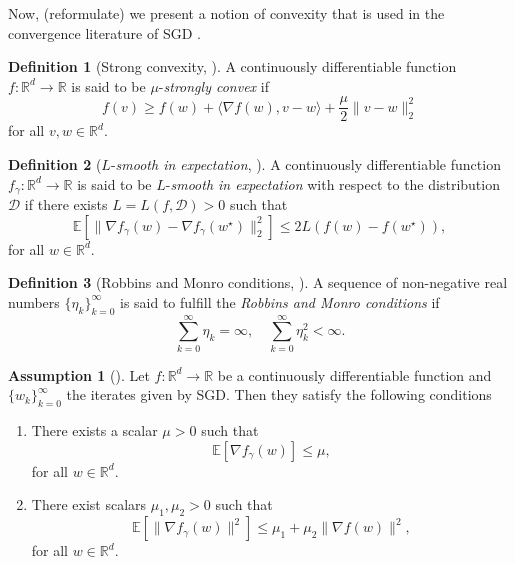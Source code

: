 \documentclass[12pt]{article}
\theoremstyle{definition}
\newtheorem{definition}[definition]{Definition}
\newtheorem{assumption}[assumption]{Assumption}
\numberwithin{equation}{section}
\newcommand{\R}{\mathbb{R}}
\newcommand{\ev}[1]{\mathbb{E}\left[{#1}\right]}
\newcommand{\norm}[1]{\lVert{#1}\rVert_2}
\begin{document}
Now, (reformulate) we present a notion of convexity that is used in the convergence literature of SGD \autocite{sebbouhAlmostSureConvergence2021}. 
\begin{definition}[Strong convexity, ]
  A continuously differentiable function $f : \mathbb{R}^d \rightarrow \mathbb{R}$ is said to be $\mu$-\emph{strongly convex} if
  \begin{equation}
    f(v) \geq f(w) + \langle \nabla f(w), v - w \rangle + \frac{\mu}{2} \norm{v - w}^2
  \end{equation}
  for all $v, w \in \mathbb{R}^d$.
\end{definition}

\begin{definition}[$L$-\emph{smooth in expectation}, ]
  A continuously differentiable  function $f_{\gamma}:\mathbb{R}^d \rightarrow \mathbb{R}$ is said to be $L$-\emph{smooth in expectation} with respect to the distribution $\mathcal{D}$ if there exists $L = L(f, \mathcal{D}) > 0$ such that 
  \begin{equation}
    \mathbb{E}[\norm{\nabla f_{\gamma}(w) - \nabla f_{\gamma}(w^\star)}^2] \leq 2 L(f(w) - f(w^\star)),
  \end{equation}
  for all $w \in \mathbb{R}^d$. 
\end{definition}

\begin{definition}[Robbins and Monro conditions, \cite{robbinsStochasticApproximationMethod1951}]
  A sequence of non-negative real numbers $\{\eta_k\}_{k=0}^\infty$ is said to fulfill the \emph{Robbins and Monro conditions} if
  \begin{equation*}
    \sum_{k=0}^\infty \eta_k = \infty, \quad \sum_{k=0}^\infty \eta_k^2 < \infty.
  \end{equation*}
\end{definition}

\begin{assumption}[]
  \label{as:sgd_convergence}
  Let $f : \R^d \rightarrow \R$ be a continuously differentiable function and $\{w_k\}_{k=0}^\infty$ the iterates given by SGD. Then they satisfy the following conditions
  \begin{enumerate}[label=(\roman*)]
    \item There exists a scalar $\mu > 0$ such that 
    \begin{equation*}
      \ev{\nabla f_{\gamma}(w)} \leq \mu,
    \end{equation*}
    for all $w \in \R^d$.
    \item There exist scalars $\mu_1, \mu_2 > 0$ such that 
    \begin{equation*}
      \label{eq:variance_linear_growth}
      \ev{\lVert \nabla f_{\gamma}(w) \rVert^2} \leq \mu_1 + \mu_2 \lVert \nabla f(w) \rVert^2,
    \end{equation*}
    for all $w \in \R^d$.
  \end{enumerate}
\end{assumption}
\end{document}
